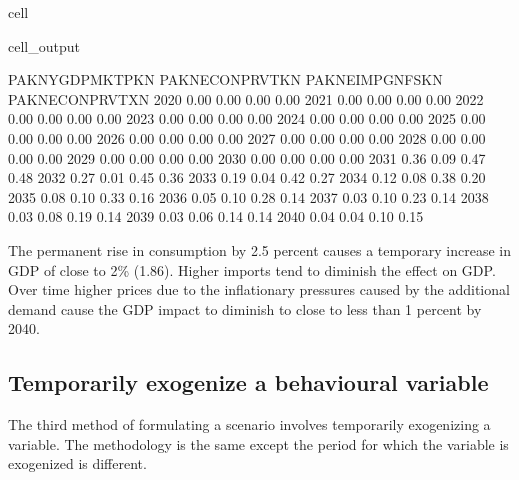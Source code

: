 \documentclass[letterpaper,10pt,english]{jupyterBook}
\begin{document}
\begin{sphinxuseclass}{cell}
\begin{sphinxVerbatimOutput}
\begin{sphinxuseclass}{cell_output}
\begin{sphinxVerbatim}[commandchars=\\\{\}]
      PAKNYGDPMKTPKN  PAKNECONPRVTKN  PAKNEIMPGNFSKN  PAKNECONPRVTXN
2020            0.00            0.00            0.00            0.00
2021            0.00            0.00            0.00            0.00
2022            0.00            0.00            0.00            0.00
2023            0.00            0.00            0.00            0.00
2024            0.00            0.00            0.00            0.00
2025            0.00            0.00            0.00            0.00
2026            0.00            0.00            0.00            0.00
2027            0.00            0.00            0.00            0.00
2028            0.00            0.00            0.00            0.00
2029            0.00            0.00            0.00            0.00
2030            0.00            0.00            0.00            0.00
2031           \PYGZhy{}0.36           \PYGZhy{}0.09            0.47            0.48
2032           \PYGZhy{}0.27           \PYGZhy{}0.01            0.45            0.36
2033           \PYGZhy{}0.19            0.04            0.42            0.27
2034           \PYGZhy{}0.12            0.08            0.38            0.20
2035           \PYGZhy{}0.08            0.10            0.33            0.16
2036           \PYGZhy{}0.05            0.10            0.28            0.14
2037           \PYGZhy{}0.03            0.10            0.23            0.14
2038           \PYGZhy{}0.03            0.08            0.19            0.14
2039           \PYGZhy{}0.03            0.06            0.14            0.14
2040           \PYGZhy{}0.04            0.04            0.10            0.15
\end{sphinxVerbatim}

\end{sphinxuseclass}\end{sphinxVerbatimOutput}

\end{sphinxuseclass}
\sphinxAtStartPar
The permanent rise in consumption by 2.5 percent causes a temporary increase in GDP of close to 2\% (1.86). Higher imports tend to diminish the effect on GDP. Over time higher prices due to the inflationary pressures caused by the additional demand cause the GDP impact to diminish to close to less than 1 percent by 2040.


\subsection{Temporarily exogenize a behavioural variable}
\label{\detokenize{content/05_WBModels/ScenarioAnalysis:temporarily-exogenize-a-behavioural-variable}}
\sphinxAtStartPar
The third method of formulating a scenario involves temporarily exogenizing a variable. The methodology is the same except the period for which the variable is exogenized is different.
\end{document}
